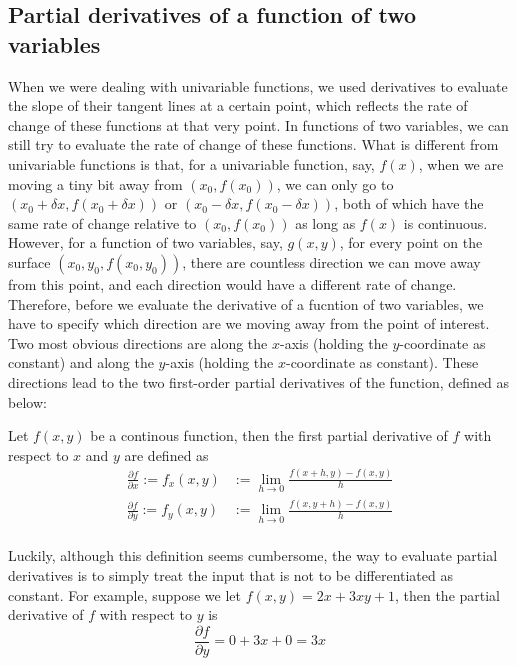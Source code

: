 \subsection{Partial derivatives of a function of two variables}
When we were dealing with univariable functions, we used derivatives to evaluate the slope of their tangent lines at a certain point, which reflects the rate of change of these functions at that very point.  In functions of two variables, we can still try to evaluate the rate of change of these functions.  What is different from univariable functions is that, for a univariable function, say, $f(x)$, when we are moving a tiny bit away from $(x_0, f(x_0))$, we can only go to $(x_0 + \delta x, f(x_0+ \delta x))$ or $(x_0 - \delta x, f(x_0 - \delta x))$, both of which have the same rate of change relative to $(x_0, f(x_0))$ as long as $f(x)$ is continuous.  However, for a function of two variables, say, $g(x,y)$, for every point on the surface $(x_0, y_0, f(x_0, y_0))$, there are countless direction we can move away from this point, and each direction would have a different rate of change.  Therefore, before we evaluate the derivative of a fucntion of two variables, we have to specify which direction are we moving away from the point of interest.  Two most obvious directions are along the $x$-axis (holding the $y$-coordinate as constant) and along the $y$-axis (holding the $x$-coordinate as constant).  These directions lead to the two first-order partial derivatives of the function, defined as below:

\begin{defi}{}
    Let $f(x,y)$ be a continous function, then the first partial derivative of $f$ with respect to $x$ and $y$ are defined as
    \begin{align*}
        \frac{\partial f}{\partial x} := f_x(x,y) &:= \lim_{h \rightarrow 0} \frac{f(x+h,y)-f(x,y)}{h}\\
        \frac{\partial f}{\partial y} := f_y(x, y) &:= \lim_{h \rightarrow 0} \frac{f(x,y+h)-f(x,y)}{h}\\
    \end{align*}
\end{defi}

Luckily, although this definition seems cumbersome, the way to evaluate partial derivatives is to simply treat the input that is not to be differentiated as constant.  For example, suppose we let $f(x, y) = 2x + 3xy + 1$, then the partial derivative of $f$ with respect to $y$ is
\[\frac{\partial f}{\partial y} = 0 + 3x + 0 = 3x\]